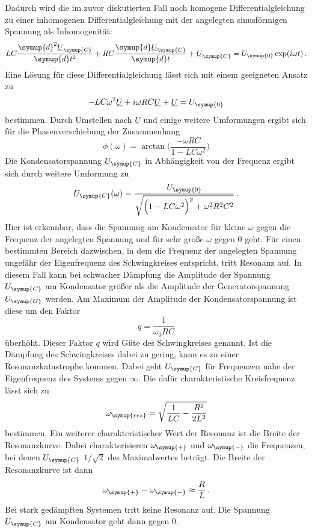 Dadurch wird die im zuvor diskutierten Fall noch homogene Differentialgleichung zu einer
inhomogenen Differentialgleichung mit der angelegten sinusförmigen Spannung
als Inhomogenität:
\begin{equation}
  LC\frac{\symup{d}^2\underline{U}_{\symup{C}}}{\symup{d}t^2}
  +RC\frac{\symup{d}\underline{U}_{\symup{C}}}{\symup{d}t}
  +\underline{U}_{\symup{C}} = U_{\symup{0}}\exp(i\omega t) \,.
\end{equation}
Eine Lösung für diese Differentialgleichung lässt sich mit einem geeigneten Ansatz
zu
\begin{equation}
  -LC\omega^2\underline{U}+i\omega R C\underline{U}+\underline{U}=U_{\symup{0}}
\end{equation}
bestimmen. Durch Umstellen nach $\underline{U}$ und einige weitere Umformungen ergibt
sich für die Phasenverschiebung der Zusammenhang
\begin{equation}
  \phi(\omega)=\arctan\biggl(\frac{-\omega R C}{1-L C \omega^2}\biggr)
  \label{eqn:phase}
\end{equation}
Die Kondensatorspannung $U_{\symup{C}}$ in Abhängigkeit von der Frequenz ergibt sich
durch weitere Umformung zu
\begin{equation}
  U_{\symup{C}}(\omega)=\frac{U_{\symup{0}}}{\sqrt{\Bigl(1-LC\omega^2\Bigr)^2+\omega^2 R^2 C^2}} \,.
  \label{eqn:Ucfrequenz}
\end{equation}
Hier ist erkennbar, dass die Spannung am Kondensator für kleine $\omega$ gegen
die Frequenz der angelegten Spannung und für sehr große $\omega$ gegen $0$ geht.
Für einen bestimmten Bereich dazwischen, in dem die Frequenz der angelegten Spannung
ungefähr der Eigenfrequenz des Schwingkreises entspricht, tritt Resonanz auf. In
diesem Fall kann bei schwacher Dämpfung die Amplitude der Spannung $U_{\symup{C}}$ am Kondensator größer
als die Amplitude der Generatorspannung $U_{\symup{G}}$ werden.
Am Maximum der Amplitude der Kondensatorspannung ist diese um den Faktor
\begin{equation}
  q = \frac{1}{\omega_0 RC}
  \label{eqn:guete}
\end{equation}
überhöht. Dieser Faktor $q$ wird Güte des Schwingkreises genannt.
Ist die Dämpfung
des Schwingkreises dabei zu gering, kann es zu einer Resonanzkatastrophe kommen.
Dabei geht $U_{\symup{C}}$ für Frequenzen nahe der Eigenfrequenz des Systems
gegen $\infty$. Die dafür charakteristische Kreisfrequenz lässt sich zu
\begin{equation}
  \omega_{\symup{res}}=\sqrt{\frac{1}{LC}-\frac{R^2}{2L^2}}
  \label{eqn:resonanzfrequenz}
\end{equation}
bestimmen. Ein weiterer charakteristischer Wert der Resonanz ist die Breite
der Resonanzkurve. Dabei charakterisieren $\omega_{\symup{+}}$ und $\omega_{\symup{-}}$
die Frequenzen, bei denen $U_{\symup{C}}$ $1/\sqrt{2}$ des Maximalwertes beträgt.
Die Breite der Resonanzkurve ist dann
\begin{equation}
  \omega_{\symup{+}} - \omega_{\symup{-}} \approx \frac{R}{L} \,.
  \label{eqn:breite}
\end{equation}
Bei stark gedämpften Systemen tritt keine Resonanz auf. Die Spannung $U_{\symup{C}}$
am Kondensator geht dann gegen $0$.

